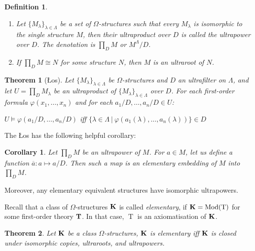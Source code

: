 \documentclass[a4paper]{article}
\theoremstyle{defin}
\newtheorem{defin}{Definition}
\theoremstyle{theorem}
\newtheorem{theorem}{Theorem}
\theoremstyle{prop}
\theoremstyle{lemma}
\theoremstyle{ex}
\theoremstyle{col}
\newtheorem{col}{Corollary}
\begin{document}
\begin{defin}
$ $

  \begin{enumerate}
    \item Let $\{ M_{\lambda}\}_{\lambda \in \Lambda}$ be a set of $\Omega$-structures such that every
    $M_{\lambda}$ is isomorphic to the single structure $M$, then their ultraproduct over $D$ is called the ultrapower over $D$.
    The denotation is $\prod \limits_{D} M$ or $M^{\Lambda} / D$.
    \item If $\prod \limits_{D} M \cong N$ for some structure $N$, then $M$ is an ultraroot of $N$.
  \end{enumerate}
\end{defin}

\begin{theorem}[\L{}os]

  Let $\{ M_{\lambda}\}_{\lambda \in \Lambda}$ be $\Omega$-structures and $D$ an ultrafilter on $\Lambda$, and let
  $U = \prod \limits_{D} M_{\lambda}$ be an ultraproduct of $\{ M_{\lambda}\}_{\lambda \in \Lambda}$ over $D$. For each first-order formula
  $\varphi(x_1, \dots, x_n)$ and for each $a_1 / D, \dots, a_n / D \in U$:

\begin{center}
  $U \models \varphi(a_1 / D, \dots, a_n / D)$ iff $\{ \lambda \in \Lambda \: | \: \varphi(a_1(\lambda), \dots, a_n(\lambda))\} \in D$
\end{center}
\end{theorem}

The \L{}os has the following helpful corollary:

\begin{col}
  Let $\prod \limits_{D} M$ be an ultrapower of $M$. For $a \in M$, let us define a function $\overline{a} : a \mapsto a / D$.
  Then such a map is an elementary embedding of $M$ into $\prod \limits_{D} M$.
\end{col}

Moreover, any elementary equivalent structures have isomorphic ultrapowers.

Recall that a class of $\Omega$-structures ${\bf K}$ is called \emph{elementary}, if ${\bf K} = \operatorname{Mod}(\operatorname{T})$ for some first-order theory ${\bf T}$. In that case, $\operatorname{T}$ is an axiomatisation of ${\bf K}$.

\begin{theorem}
  Let ${\bf K}$ be a class $\Omega$-structures,
  ${\bf K}$ is elementary iff ${\bf K}$ is closed under isomorphic copies, ultraroots, and ultrapowers.
\end{theorem}
\end{document}
